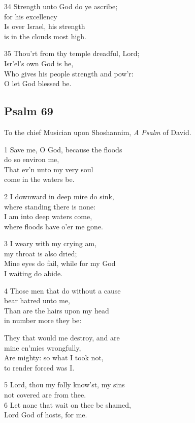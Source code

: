 34 Strength unto God do ye ascribe;\\
for his excellency\\
Is over Israel, his strength\\
is in the clouds most high.

35 Thou’rt from thy temple dreadful, Lord;\\
Isr’el’s own God is he,\\
Who gives his people strength and pow’r:\\
O let God blessed be.

\begin{center}
\quad{}\quad{}
\end{center}
\subsection*{Psalm 69}

To the chief Musician upon Shoshannim,
\emph{A Psalm} of David.

1 Save me, O God, because the floods\\
do so environ me,\\
That ev’n unto my very soul\\
come in the waters be.

2 I downward in deep mire do sink,\\
where standing there is none:\\
I am into deep waters come,\\
where floods have o’er me gone.

3 I weary with my crying am,\\
my throat is also dried;\\
Mine eyes do fail, while for my God\\
I waiting do abide.

4 Those men that do without a cause\\
bear hatred unto me,\\
Than are the hairs upon my head\\
in number more they be:

They that would me destroy, and are\\
mine en’mies wrongfully,\\
Are mighty: so what I took not,\\
to render forced was I.

5 Lord, thou my folly know’st, my sins\\
not covered are from thee.\\
6 Let none that wait on thee be shamed,\\
Lord God of hosts, for me.

